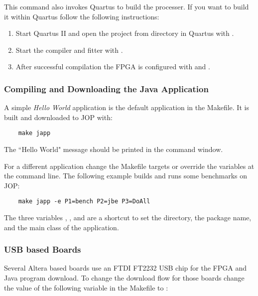 This command also invokes Quartus to build the processer. If you
want to build it within Quartus follow the following instructions:

\label{subsubsec:quartus}

\begin{enumerate}
  \item Start Quartus II and open the project  from
      directory  in Quartus with
      .
  \item Start the compiler and fitter with .
  \item After successful compilation the FPGA is configured with
       and .
\end{enumerate}



\subsubsection{Compiling and Downloading the Java Application}

A simple \emph{Hello World} application is the default application
in the Makefile. It is built and downloaded to JOP with:

\begin{verbatim}
    make japp
\end{verbatim}

The ``Hello World" message should be printed in the command window.

For a different application change the Makefile targets or override
the  variables at the command line. The following example
builds and runs some benchmarks on JOP:

\begin{verbatim}
    make japp -e P1=bench P2=jbe P3=DoAll
\end{verbatim}

The three variables , , and  are a
shortcut to set the directory, the package name, and the main class
of the application.

\subsubsection{USB based Boards}

Several Altera based boards use an FTDI FT2232 USB chip for the FPGA
and Java program download. To change the download flow for those
boards change the value of the following variable in the Makefile to
:


